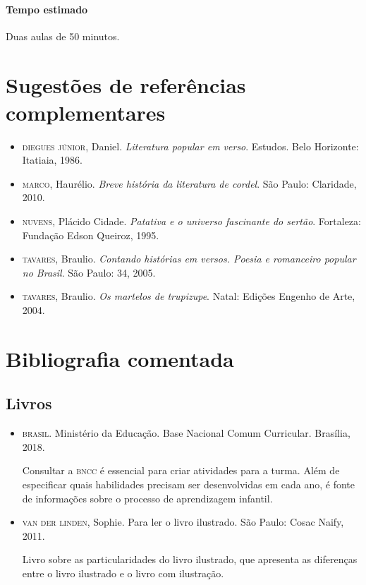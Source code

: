 \documentclass[11pt]{extarticle}
\begin{document}
\paragraph{Tempo estimado} Duas aulas de 50 minutos.


\section{Sugestões de referências complementares}


\begin{itemize}
\item \textsc{diegues júnior}, Daniel. \textit{Literatura popular em verso}. Estudos. Belo Horizonte: Itatiaia, 1986. 

\item \textsc{marco}, Haurélio. \textit{Breve história da literatura de cordel}. São Paulo: Claridade, 2010.

\item \textsc{nuvens}, Plácido Cidade. \textit{Patativa e o universo fascinante
do sertão}. Fortaleza: Fundação Edson Queiroz, 1995.

\item \textsc{tavares}, Braulio. \textit{Contando histórias em versos. Poesia e romanceiro popular no Brasil}. São Paulo: 34, 2005.

\item \textsc{tavares}, Braulio. \textit{Os martelos de trupizupe}. Natal: Edições Engenho de Arte, 2004.
\end{itemize}

\section{Bibliografia comentada}

\subsection{Livros}

\begin{itemize}
\item \textsc{brasil}. Ministério da Educação. Base Nacional Comum Curricular. Brasília, 2018.

Consultar a \textsc{bncc} é essencial para criar atividades para a turma. Além de especificar 
quais habilidades precisam ser desenvolvidas em cada ano, é fonte de informações sobre 
o processo de aprendizagem infantil. 

 
\item \textsc{van der linden}, Sophie. Para ler o livro ilustrado. São Paulo: Cosac Naify, 2011.

Livro sobre as particularidades do livro ilustrado, que apresenta as diferenças entre o livro ilustrado e o livro com ilustração. 
\end{itemize}
\end{document}
